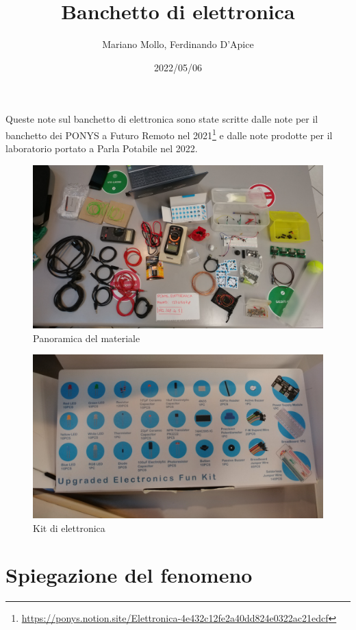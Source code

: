\documentclass[a4paper]{article}
\title{Banchetto di elettronica}
\author{Mariano Mollo, Ferdinando D'Apice}
\date{2022/05/06}
\begin{document}
\maketitle{}

Queste note sul banchetto di elettronica sono state scritte dalle note per il
banchetto dei PONYS a Futuro Remoto nel 2021\footnote{
  \url{https://ponys.notion.site/Elettronica-4e432c12fe2a40dd824e0322ac21edcf} }
e dalle note prodotte per il laboratorio portato a Parla Potabile nel 2022.

\begin{figure}[ht]
  \centering
  \includegraphics[angle=90, width=\linewidth]{figures/panoramica_materiale}
  \caption{\label{fig:panoramica} Panoramica del materiale}
\end{figure}

\begin{figure}[ht]
  \centering
  \includegraphics[width=\linewidth]{figures/kit_elettronica}
  \caption{\label{fig:kit} Kit di elettronica}
\end{figure}

\section{Spiegazione del fenomeno}%
\label{sec:fenomeno}
\end{document}
